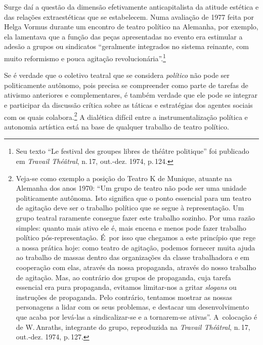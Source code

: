
Surge daí a questão da dimensão efetivamente anticapitalista da
atitude estética e das relações extraestéticas que se estabelecem. Numa
avaliação de 1977 feita por Helga Vormus durante um encontro de teatro
político na Alemanha, por exemplo, ela lamentava que a função das peças
apresentadas no evento era estimular a adesão a grupos ou sindicatos
“geralmente integrados no sistema reinante, com muito reformismo e pouca
agitação revolucionária”.\footnote{Seu texto “Le festival des groupes
  libres de théâtre politique” foi publicado em
  {\it Travail Théâtral}, n.\,17, out.-dez. 1974, p.\,124.}

Se é verdade que o coletivo teatral que se considera {\it político} não
pode ser politicamente autônomo, pois precisa se compreender como parte
de tarefas de ativismo anteriores e complementares, é também verdade que
ele pode se integrar e participar da discussão crítica sobre as táticas
e estratégias dos agentes sociais com os quais colabora.\footnote{Veja-se
  como exemplo a posição do Teatro K de Munique, atuante na
  Alemanha dos anos 1970: “Um grupo de teatro não pode ser uma unidade
  politicamente autônoma. Isto significa que o ponto essencial para um
  teatro de agitação deve ser o trabalho político que se segue à
  representação. Um grupo teatral raramente consegue fazer este trabalho
  sozinho. Por uma razão simples: quanto mais ativo ele é, mais encena e
  menos pode fazer trabalho político pós-representação. É~por isso que
  chegamos a este princípio que rege a nossa prática hoje: como teatro
  de agitação, podemos fornecer muita ajuda ao trabalho de massas dentro
  das organizações da classe trabalhadora e em cooperação com elas,
  através da nossa propaganda, através do nosso trabalho de agitação.
  Mas, ao contrário dos grupos de propaganda, cuja tarefa essencial era
  pura propaganda, evitamos limitar-nos a gritar {\it slogans} ou instruções
  de propaganda. Pelo contrário, tentamos mostrar as nossas personagens
  a lidar com os seus problemas, e destacar um desenvolvimento que acaba
  por levá-las a sindicalizar-se e a tornarem-se ativas”. A~colocação é
  de W.\,Anraths, integrante do grupo, reproduzida na {\it Travail
  Théâtral}, n.\,17, out.-dez. 1974, p.\,127.} A dialética difícil entre a
instrumentalização política e autonomia artística está na base de
qualquer trabalho de teatro político.

